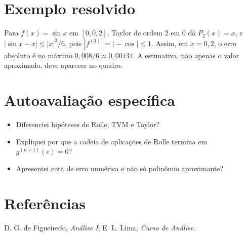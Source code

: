 \documentclass[11pt,a4paper]{article}
\begin{document}
\section{Exemplo resolvido}
Para $f(x)=\sin x$ em $[0,0{,}2]$, Taylor de ordem $2$ em $0$ dá $P_2(x)=x$, e
$|\sin x-x|\le |x|^3/6$, pois $|f^{(3)}|=|\!-\cos|\le1$. Assim, em $x=0{,}2$, o erro absoluto é no máximo $0{,}008/6\approx0{,}00134$. A estimativa, não apenas o valor aproximado, deve aparecer no quadro.
\section{Autoavaliação específica}
\begin{itemize}
\item Diferenciei hipóteses de Rolle, TVM e Taylor?
\item Expliquei por que a cadeia de aplicações de Rolle termina em $g^{(n+1)}(c)=0$?
\item Apresentei cota de erro numérica e não só polinômio aproximante?
\end{itemize}
\RubricaUFMT
\section{Referências}
D. G. de Figueiredo, \emph{Análise I}; E. L. Lima, \emph{Curso de Análise}.
\end{document}
